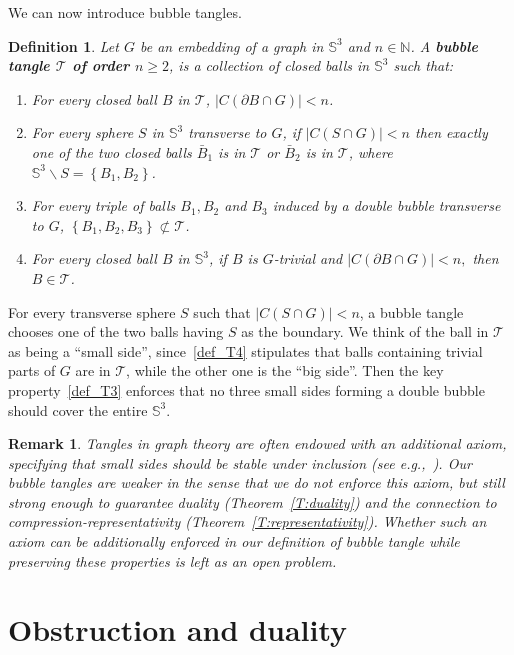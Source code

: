 \documentclass[11pt,a4paper]{article}
\newcommand\ens[1]{\left\{ #1 \right\}}
\newcommand{\N}{\mathds N}
\newcommand{\Sp}{\mathbb S}
\newcommand{\bfdex}[1]{\textbf{#1}\index{#1}}
\newcommand{\T}{\mathcal{T}}
\newtheorem{defn}[theorem]{Definition}
\newtheorem{remark}[theorem]{Remark}
\begin{document}
We can now introduce bubble tangles.

\begin{defn}
Let $G$ be an embedding of a graph in $\Sp^3$ and $n \in \N$. A \bfdex{bubble tangle $\mathcal{T}$ of order $n\geq 2$}, is a collection of closed balls in $\Sp^3$ such that: 
\begin{enumerate}[label = (T\arabic*)]
	\item \label{def_T1} For every closed ball $B$ in $\mathcal{T}$, $|C(\partial B \cap G)| < n$.
	\item \label{def_T2} For every sphere $S$ in $\Sp^3$ transverse to $G$, if $|C(S \cap G)| < n$ then exactly one of the two closed balls $\bar B_1$ is in $\T$ or $\bar B_2$ is in $\T$, where $\Sp^3 \smallsetminus S = \ens{B_1, B_2}$. 
	\item \label{def_T3} For every triple of balls $B_1,B_2$ and $B_3$ induced by a double bubble transverse to $G$, $\ens{B_1, B_2, B_3} \not \subset \T$.  
	\item \label{def_T4} For every closed ball $B$ in $\Sp^3$, if $B$ is $G$-trivial and $|C(\partial B \cap G)| < n,$ then $B \in \T$.
\end{enumerate}
\end{defn}

For every transverse sphere $S$ such that $|C(S \cap G)| < n$, a bubble tangle chooses one of the two balls having $S$ as the boundary. We think of the ball in $\T$ as being a ``small side'', since~\ref{def_T4} stipulates that balls containing trivial parts of $G$ are in $\T$, while the other one is the ``big side''. Then the key property~\ref{def_T3} enforces that no three small sides forming a double bubble should cover the entire $\Sp^3$.


\begin{remark} Tangles in graph theory are often endowed with an additional axiom, specifying that small sides should be stable under inclusion (see e.g.,~\cite[Axiom~(T3A)]{Geelen_Matroid}). Our bubble tangles are weaker in the sense that we do not enforce this axiom, but still strong enough to guarantee duality (Theorem~\ref{T:duality}) and the connection to compression-representativity (Theorem~\ref{T:representativity}). Whether such an axiom can be additionally enforced in our definition of bubble tangle while preserving these properties is left as an open problem.
\end{remark}

\section{Obstruction and duality}\label{S:duality}
\end{document}
